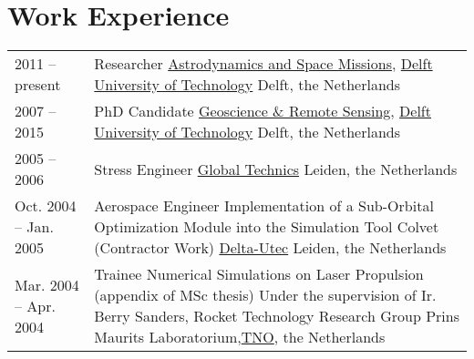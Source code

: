 \documentclass[a4paper]{article}
\newlength{\listskipbig}
\newenvironment{cvsection}[2]{
  \vspace{0.15in}
  \section*{#1}
  \vspace{-0.2in}
  \begin{longtable}{lp{#2}}
}{
  \end{longtable}
}
\begin{document}



\begin{cvsection}{Work Experience}{10.8cm}

2011 -- present
  & Researcher\newline
    \href{http://www.as.lr.tudelft.nl}{Astrodynamics and Space Missions}, \href{http://www.tudelft.nl/}{Delft University of Technology}\newline
    Delft, the Netherlands\\[\listskipbig]

2007 -- 2015
  & PhD Candidate\newline
    \href{http://www.citg.tudelft.nl/over-faculteit/afdelingen/geoscience-and-remote-sensing/}{Geoscience \& Remote Sensing}, \href{http://www.tudelft.nl/}{Delft University of Technology}\newline
    Delft, the Netherlands\\[\listskipbig]

2005 -- 2006
  & Stress Engineer\newline
    \href{http://www.globaltechnics.nl/}{Global Technics}\newline
    Leiden, the Netherlands\\[\listskipbig]


Oct. 2004 -- Jan. 2005
  & Aerospace Engineer\newline
  Implementation of a Sub-Orbital Optimization Module into the Simulation Tool Colvet (Contractor Work)\newline
  \href{http://www.delta-utec.com/}{Delta-Utec}\newline
  Leiden, the Netherlands\\[\listskipbig]

Mar. 2004 -- Apr. 2004
  & Trainee\newline
    Numerical Simulations on Laser Propulsion (appendix of MSc thesis)\newline
    Under the supervision of Ir. Berry Sanders, Rocket Technology Research Group\newline
    Prins Maurits Laboratorium,\href{http://www.tno.nl/}{TNO}, the Netherlands\\[\listskipbig]


\end{cvsection}
\end{document}
